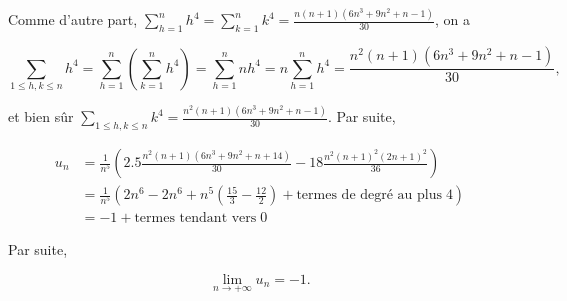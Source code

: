 {\begin{enumerate}
{Comme d'autre part, $\sum_{h=1}^{n}h^4=\sum_{k=1}^{n}k^4=\frac{n(n+1)(6n^3+9n^2+n-1)}{30}$, on a

$$\sum_{1\leq h,k\leq
n}^{}h^4=\sum_{h=1}^{n}(\sum_{k=1}^{n}h^4)=\sum_{h=1}^{n}nh^4=n\sum_{h=1}^{n}h^4=\frac{n^2(n+1)(6n^3+9n^2+n-1)}{30},$$

et bien sûr $\sum_{1\leq h,k\leq
n}^{}k^4=\frac{n^2(n+1)(6n^3+9n^2+n-1)}{30}$. Par suite,

\begin{align*}
u_n&=\frac{1}{n^5}\left(2.5\frac{n^2(n+1)(6n^3+9n^2+n+14)}{30}-18\frac{n^2(n+1)^2(2n+1)^2}{36}\right)\\
 &=\frac{1}{n^5}(2n^6-2n^6+n^5(\frac{15}{3}-\frac{12}{2})+\mbox{termes de degré au plus}\;4)\\
 &=-1+\mbox{termes tendant vers}\;0
\end{align*}

Par suite,

$$\lim_{n\rightarrow +\infty}u_n=-1.$$}
\end{enumerate}
}
